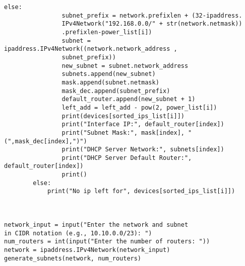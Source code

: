 \begin{lstlisting}[style=pythonStyle, caption={Automated Subnet Allocation.}, backgroundcolor=\color{codebackground}]
            else: 
                subnet_prefix = network.prefixlen + (32-ipaddress.
                IPv4Network("192.168.0.0/" + str(network.netmask))
                .prefixlen-power_list[i])
                subnet = ipaddress.IPv4Network((network.network_address , 
                subnet_prefix))
                new_subnet = subnet.network_address 
                subnets.append(new_subnet)
                mask.append(subnet.netmask)
                mask_dec.append(subnet_prefix)
                default_router.append(new_subnet + 1)
                left_add = left_add - pow(2, power_list[i])
                print(devices[sorted_ips_list[i]])
                print("Interface IP:", default_router[index])
                print("Subnet Mask:", mask[index], "(",mask_dec[index],")")
                print("DHCP Server Network:", subnets[index])
                print("DHCP Server Default Router:", default_router[index])
                print()
        else:
            print("No ip left for", devices[sorted_ips_list[i]])



network_input = input("Enter the network and subnet 
in CIDR notation (e.g., 10.10.0.0/23): ")
num_routers = int(input("Enter the number of routers: "))
network = ipaddress.IPv4Network(network_input)
generate_subnets(network, num_routers)

          
\end{lstlisting}

